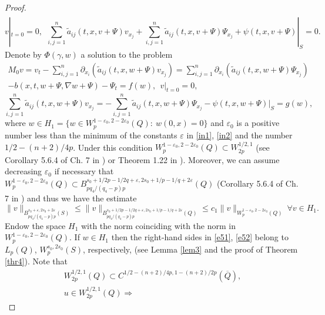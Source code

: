 \documentclass{article}
\theoremstyle{plain}
\begin{document}
\begin{proof}
\begin{multline}
\end{multline}
\begin{equation}\label{e50}
	v|_{t=0}=0,\ \  \sum_{i,j=1}^n  \tilde{a}_{ij}(t,x,v+\Psi) v_{x_j}+ \sum_{i,j=1}^n  \tilde{a}_{ij}(t,x,v+\Psi) \Psi_{x_j} + {\psi}(t,x,v+\Psi)|_{S}=0.  
\end{equation}
Denote by  $\Phi(\gamma,w)$ a solution to the  problem 
\begin{multline}\label{e51}
	M_0v= v_t-\sum_{i,j=1}^n \partial_{x_i}(\tilde{a}_{ij}(t,x,w+\Psi)v_{x_j})= \sum_{i,j=1}^n \partial_{x_i}( \tilde{a}_{ij}(t,x,w+\Psi)\Psi_{x_j}) \\ - {b}(x,t,w+\Psi,\nabla w+\Psi)-\Psi_t =f(w),\  \ v|_{t=0}=0,\
\end{multline}
\begin{equation}\label{e52}
	  \sum_{i,j=1}^n  \tilde{a}_{ij}(t,x,w+\Psi) v_{x_j}=- \sum_{i,j=1}^n  \tilde{a}_{ij}(t,x,w+\Psi) \Psi_{x_j}-  {\psi}(t,x,w+\Psi)|_{S}=g(w),  
\end{equation}
where  $w\in H_1=\{w\in W_{p}^{1-\varepsilon_0,2-2\varepsilon_0}(Q): \  w(0,x)=0\}$ and  $\varepsilon_0$ is a positive number less than the minimum of the constants 
 $\varepsilon$ in \eqref{in1}, \eqref{in2} and the number $1/2-(n+2)/4p$. Under this condition  $W_{p}^{1-\varepsilon_0,2-2\varepsilon_0}(Q)\subset W_{2p}^{1/2,1}$ 
(see Corollary  5.6.4 of Ch.  7 in \cite{ama}) or Theorem  1.22 in \cite{pya11}). Moreover, we can assume  decreasing $\varepsilon_0 $ if necessary that 
$W_p^{1-\varepsilon_0,2-2\varepsilon_0}(Q)\subset B_{pq_4/(q_4-p) p}^{s_0+1/2p-1/2q+\varepsilon, 2s_0+1/p-1/q+2\varepsilon}(Q) $ (Corollary  5.6.4 of Ch. 7 in \cite{ama})
and thus we have the estimate 
\begin{equation}\label{a52}
\|v\|_{B_{pq_4/(q_4-p) p}^{s_0+\varepsilon, 2s_0+2\varepsilon}(S)}\leq \|v\|_{B_{pq_4/(q_4-p) p}^{s_0+1/2p-1/2q+\varepsilon, 2s_0+1/p-1/q+2\varepsilon}(Q)}\leq 
c_1\|v\|_{W_p^{1-\varepsilon_0,2-2\varepsilon_0}(Q)}\ \forall v\in H_1. 
\end{equation}
 Endow the space  $H_1$ with the norm coinciding with the norm in $W_{p}^{1-\varepsilon_0,2-2\varepsilon_0}(Q)$.  If 
  $w\in H_1$ then the right-hand sides in \eqref{e51},  \eqref{e52} belong to  $L_p(Q)$, $W_p^{s_0,2s_0}(S)$, respectively,  (see Lemma \ref{lem3} and the proof of Theorem 
   \ref{thr4}). 
Note that 
\begin{multline}\label{e53} 
  W_{2p}^{1/2,1}(Q)\subset   C^{1/2-(n+2)/4p, 1-(n+2)/2p}(\overline{Q}),\\ u\in W_{2p}^{1/2,1}(Q) \Rightarrow

\end{multline}
\end{proof}
\end{document}
